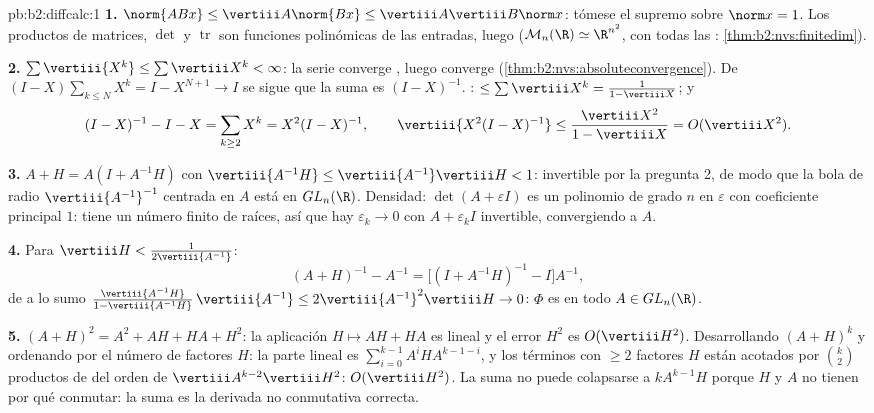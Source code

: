 \begin{solution}{pb:b2:diffcalc:1}
\textbf{1.} $\norm{ABx} \leq \vertiii A\norm{Bx} \leq \vertiii
A\vertiii B\norm x$: tómese el supremo sobre $\norm x = 1$. Los
productos de matrices, $\det$ y $\operatorname{tr}$ son funciones
polinómicas de las entradas, luego  ($\mathcal M_n(\R) \simeq
\R^{n^2}$, con todas las :
\cref{thm:b2:nvs:finitedim}).

\textbf{2.} $\sum\vertiii{X^k} \leq \sum\vertiii X^k < \infty$: la
serie converge , luego converge
(\cref{thm:b2:nvs:absoluteconvergence}). De $(I - X)\sum_{k\leq
N}X^k = I - X^{N+1} \to I$ se sigue que la suma es $(I - X)^{-1}$.
: $\leq \sum\vertiii X^k = \frac{1}{1 - \vertiii X}$; y
\[
(I - X)^{-1} - I - X = \sum_{k\geq2}X^k = X^2(I - X)^{-1},
\qquad
\vertiii{X^2(I-X)^{-1}} \leq
\frac{\vertiii X^2}{1 - \vertiii X} = O(\vertiii X^2).
\]

\textbf{3.} $A + H = A(I + A^{-1}H)$ con $\vertiii{A^{-1}H} \leq
\vertiii{A^{-1}}\vertiii H < 1$: invertible por la pregunta 2, de
modo que la bola  de radio $\vertiii{A^{-1}}^{-1}$ centrada en
$A$ está en $GL_n(\R)$. Densidad: $\det(A + \varepsilon I)$ es un
polinomio de grado $n$ en $\varepsilon$ con coeficiente principal
$1$: tiene un número finito de raíces, así que hay $\varepsilon_k \to
0$ con $A + \varepsilon_kI$ invertible, convergiendo a $A$.

\textbf{4.} Para $\vertiii H < \frac{1}{2\vertiii{A^{-1}}}$:
\[
(A + H)^{-1} - A^{-1}
= \bigl[(I + A^{-1}H)^{-1} - I\bigr]A^{-1},
\]
de  a lo sumo $\frac{\vertiii{A^{-1}H}}{1 -
\vertiii{A^{-1}H}}\,\vertiii{A^{-1}} \leq
2\vertiii{A^{-1}}^2\vertiii H \to 0$: $\Phi$ es  en todo $A
\in GL_n(\R)$.

\textbf{5.} $(A+H)^2 = A^2 + AH + HA + H^2$: la aplicación $H \mapsto
AH + HA$ es lineal y el error $H^2$ es $O(\vertiii H^2)$.
Desarrollando $(A + H)^k$ y ordenando por el número de factores $H$:
la parte lineal es $\sum_{i=0}^{k-1}A^iHA^{k-1-i}$, y los términos
con $\geq 2$ factores $H$ están acotados por $\binom k2$ productos de
 del orden de $\vertiii A^{k-2}\vertiii H^2$: $O(\vertiii
H^2)$. La suma no puede colapsarse a $kA^{k-1}H$ porque $H$ y $A$ no
tienen por qué conmutar: la suma es la derivada no conmutativa
correcta.


\end{solution}
